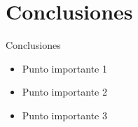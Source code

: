 \documentclass[12pt]{beamer}
\begin{document}
\section{Conclusiones}
\begin{frame}{Conclusiones}
  \begin{itemize}
    \item Punto importante 1
    \item Punto importante 2
    \item Punto importante 3
  \end{itemize}
\end{frame}
\end{document}
